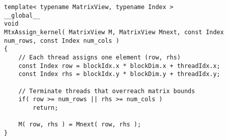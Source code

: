 \begin{lstlisting}[caption={The implementation of the \code{MtxAssign\_kernel()} kernel that assigns values of the next iteration to the matrix representing the current iteration.},label={Listing:ISxPP-implementation->kernels->matrix-assign}]
template< typename MatrixView, typename Index >
__global__
void
MtxAssign_kernel( MatrixView M, MatrixView Mnext, const Index num_rows, const Index num_cols )
{
	// Each thread assigns one element (row, rhs)
	const Index row = blockIdx.x * blockDim.x + threadIdx.x;
	const Index rhs = blockIdx.y * blockDim.y + threadIdx.y;
	
	// Terminate threads that overreach matrix bounds
	if( row >= num_rows || rhs >= num_cols )
		return;
	
	M( row, rhs ) = Mnext( row, rhs );
}
\end{lstlisting}